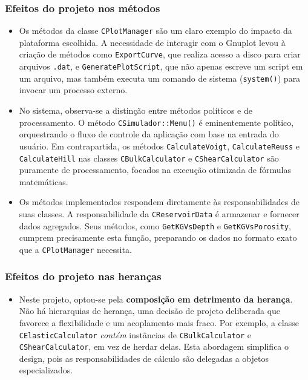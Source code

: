\subsubsection*{Efeitos do projeto nos métodos}
\begin{itemize}
    \item Os métodos da classe \texttt{CPlotManager} são um claro exemplo do impacto da plataforma escolhida. A necessidade de interagir com o Gnuplot levou à criação de métodos como \texttt{ExportCurve}, que realiza acesso a disco para criar arquivos \texttt{.dat}, e \texttt{GeneratePlotScript}, que não apenas escreve um script em um arquivo, mas também executa um comando de sistema (\texttt{system()}) para invocar um processo externo.
    
    \item No sistema, observa-se a distinção entre métodos políticos e de processamento. O método \texttt{CSimulador::Menu()} é eminentemente político, orquestrando o fluxo de controle da aplicação com base na entrada do usuário. Em contrapartida, os métodos \texttt{CalculateVoigt}, \texttt{CalculateReuss} e \texttt{CalculateHill} nas classes \texttt{CBulkCalculator} e \texttt{CShearCalculator} são puramente de processamento, focados na execução otimizada de fórmulas matemáticas.
    
    \item Os métodos implementados respondem diretamente às responsabilidades de suas classes. A responsabilidade da \texttt{CReservoirData} é armazenar e fornecer dados agregados. Seus métodos, como \texttt{GetKGVsDepth} e \texttt{GetKGVsPorosity}, cumprem precisamente esta função, preparando os dados no formato exato que a \texttt{CPlotManager} necessita.
\end{itemize}

\subsubsection*{Efeitos do projeto nas heranças}
\begin{itemize}
    \item Neste projeto, optou-se pela \textbf{composição em detrimento da herança}. Não há hierarquias de herança, uma decisão de projeto deliberada que favorece a flexibilidade e um acoplamento mais fraco. Por exemplo, a classe \texttt{CElasticCalculator} \textit{contém} instâncias de \texttt{CBulkCalculator} e \texttt{CShearCalculator}, em vez de herdar delas. Esta abordagem simplifica o design, pois as responsabilidades de cálculo são delegadas a objetos especializados.
\end{itemize}

